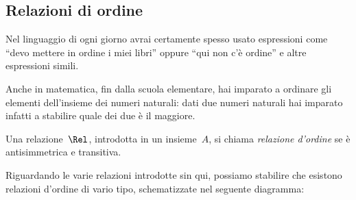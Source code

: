 \begin{comment}
\begin{definizione}
Si chiama \emph{insieme quoziente} di un insieme~$A$ rispetto a una relazione di 
equivalenza~$\Rel$,
l'insieme i cui elementi sono le classi d'equivalenza determinate dalla 
relazione~$\Rel$. L'insieme quoziente si indica con il simbolo~$A/\Rel$.
\end{definizione}

Nel caso dell'esempio precedente si passa all'insieme quoziente~$B/\Rel$ del 
seguente diagramma di Eulero-Venn:
\begin{center}
 
\end{center}


\osservazione Ogni volta che si ha una relazione d'equivalenza~$\Rel$ in un 
insieme~$A$, possiamo stabilire la seguente
catena di passaggi:
 \[\text{insieme }A\rightarrow\text{ partizione }P(A)\rightarrow\text{ insieme 
quoziente }A/\Rel.\]



\end{comment}

\subsection{Relazioni di ordine}
\label{subsec:rel_ordine}

Nel linguaggio di ogni giorno avrai certamente spesso usato espressioni come 
``devo mettere in ordine i miei
libri'' oppure ``qui non c'è ordine'' e altre espressioni simili.

Anche in matematica, fin dalla scuola elementare, hai imparato a ordinare gli 
elementi dell'insieme dei
numeri naturali: dati due numeri naturali hai imparato infatti a stabilire quale 
dei due è il maggiore.

\begin{definizione}
Una relazione~$\Rel$, introdotta in un insieme~$A$, si chiama \emph{relazione 
d'ordine} se è antisimmetrica e transitiva.
\end{definizione}

Riguardando le varie relazioni introdotte sin qui, possiamo stabilire che 
esistono relazioni d'ordine di vario tipo, schematizzate nel seguente diagramma:
\begin{center}
 
\end{center}

